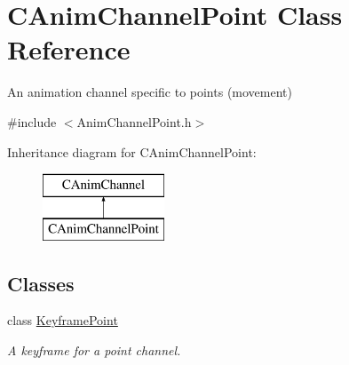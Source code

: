 \hypertarget{class_c_anim_channel_point}{\section{C\+Anim\+Channel\+Point Class Reference}
\label{class_c_anim_channel_point}
}


An animation channel specific to points (movement)  




{\ttfamily \#include $<$Anim\+Channel\+Point.\+h$>$}

Inheritance diagram for C\+Anim\+Channel\+Point\+:\begin{figure}[H]
\begin{center}
\leavevmode
\includegraphics[height=2.000000cm]{class_c_anim_channel_point}
\end{center}
\end{figure}
\subsection*{Classes}
\begin{DoxyCompactItemize}
\item 
class \hyperlink{class_c_anim_channel_point_1_1_keyframe_point}{Keyframe\+Point}
\begin{DoxyCompactList}\small\item\em A keyframe for a point channel. \end{DoxyCompactList}\end{DoxyCompactItemize}
